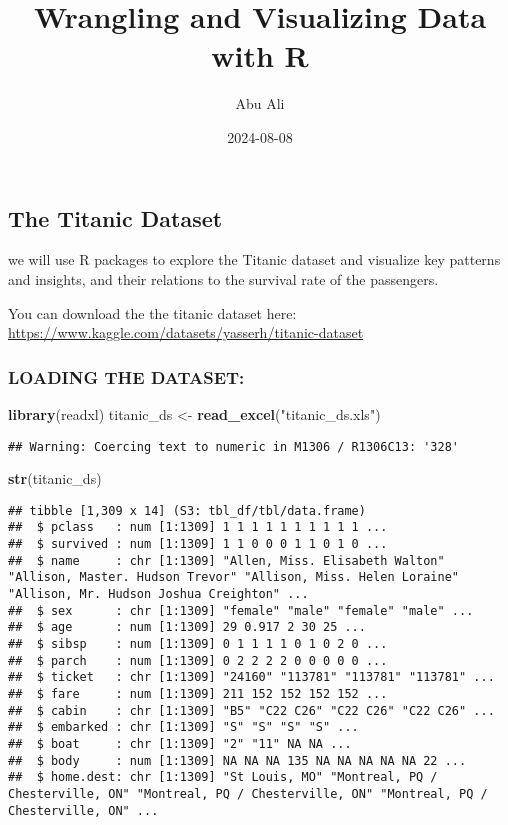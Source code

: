 \documentclass[
]{article}
\title{Wrangling and Visualizing Data with R}
\author{Abu Ali}
\date{2024-08-08}
\newenvironment{Shaded}{\begin{snugshade}}{\end{snugshade}}
\newcommand{\FunctionTok}[1]{\textcolor[rgb]{0.13,0.29,0.53}{\textbf{#1}}}
\newcommand{\NormalTok}[1]{#1}
\newcommand{\OtherTok}[1]{\textcolor[rgb]{0.56,0.35,0.01}{#1}}
\newcommand{\StringTok}[1]{\textcolor[rgb]{0.31,0.60,0.02}{#1}}
\begin{document}
\maketitle

\subsection{The Titanic Dataset}\label{the-titanic-dataset}

we will use R packages to explore the Titanic dataset and visualize key
patterns and insights, and their relations to the survival rate of the
passengers.

You can download the the titanic dataset here:
\url{https://www.kaggle.com/datasets/yasserh/titanic-dataset}

\subsubsection{LOADING THE DATASET:}\label{loading-the-dataset}

\begin{Shaded}
\begin{Highlighting}[]
\FunctionTok{library}\NormalTok{(readxl)}
\NormalTok{titanic\_ds }\OtherTok{\textless{}{-}} \FunctionTok{read\_excel}\NormalTok{(}\StringTok{"titanic\_ds.xls"}\NormalTok{)}
\end{Highlighting}
\end{Shaded}

\begin{verbatim}
## Warning: Coercing text to numeric in M1306 / R1306C13: '328'
\end{verbatim}

\begin{Shaded}
\begin{Highlighting}[]
\FunctionTok{str}\NormalTok{(titanic\_ds)}
\end{Highlighting}
\end{Shaded}

\begin{verbatim}
## tibble [1,309 x 14] (S3: tbl_df/tbl/data.frame)
##  $ pclass   : num [1:1309] 1 1 1 1 1 1 1 1 1 1 ...
##  $ survived : num [1:1309] 1 1 0 0 0 1 1 0 1 0 ...
##  $ name     : chr [1:1309] "Allen, Miss. Elisabeth Walton" "Allison, Master. Hudson Trevor" "Allison, Miss. Helen Loraine" "Allison, Mr. Hudson Joshua Creighton" ...
##  $ sex      : chr [1:1309] "female" "male" "female" "male" ...
##  $ age      : num [1:1309] 29 0.917 2 30 25 ...
##  $ sibsp    : num [1:1309] 0 1 1 1 1 0 1 0 2 0 ...
##  $ parch    : num [1:1309] 0 2 2 2 2 0 0 0 0 0 ...
##  $ ticket   : chr [1:1309] "24160" "113781" "113781" "113781" ...
##  $ fare     : num [1:1309] 211 152 152 152 152 ...
##  $ cabin    : chr [1:1309] "B5" "C22 C26" "C22 C26" "C22 C26" ...
##  $ embarked : chr [1:1309] "S" "S" "S" "S" ...
##  $ boat     : chr [1:1309] "2" "11" NA NA ...
##  $ body     : num [1:1309] NA NA NA 135 NA NA NA NA NA 22 ...
##  $ home.dest: chr [1:1309] "St Louis, MO" "Montreal, PQ / Chesterville, ON" "Montreal, PQ / Chesterville, ON" "Montreal, PQ / Chesterville, ON" ...
\end{verbatim}
\end{document}
